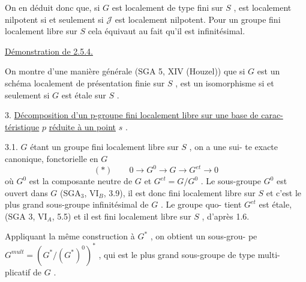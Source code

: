 
On en déduit donc que, si $G$ est localement de type fini sur
$S$ ,  est localement nilpotent si et seulement si $\mathcal{J}$ est localement
nilpotent. Pour un groupe fini localement libre sur $S$ cela équivaut au
fait qu'il est infinitésimal.

\uline{Démonstration de 2.5.4.}

On montre d'une manière générale (SGA 5, XIV (Houzel)) que si
$G$ est un schéma localement de présentation finie sur $S$ ,  est un
isomorphisme si et seulement si $G$ est étale sur $S$ .

3. \uline{Décomposition d'un p-groupe fini localement libre sur une base de carac-}
\uline{téristique} $p$ \uline{réduite à un point} $s$ .

3.1. $G$ étant un groupe fini localement libre sur $S$ , on a une sui-%
te exacte canonique, fonctorielle en $G$
\[ (*) \qquad 0 \rightarrow G^{0} \rightarrow G \rightarrow G^{et} \rightarrow 0 \]
où $G^{0}$ est la composante neutre de $G$ et $G^{et} = G/G^{0}$ . Le sous-groupe $G^{0}$
est ouvert dans $G$ (SGA$_{3}$, VI$_{B}$, 3.9), il est donc fini localement libre sur
$S$ et c'est le plus grand sous-groupe infinitésimal de $G$ . Le groupe quo-%
tient $G^{et}$ est étale, (SGA 3, VI$_{A}$, 5.5) et il est fini localement libre
sur $S$ , d'après 1.6.

Appliquant la même construction à $G^{*}$ , on obtient un sous-grou-%
pe $G^{mult} = (G^{*}/(G^{*})^{0})^{*}$ , qui est le plus grand sous-groupe de type multi-%
plicatif de $G$ .

